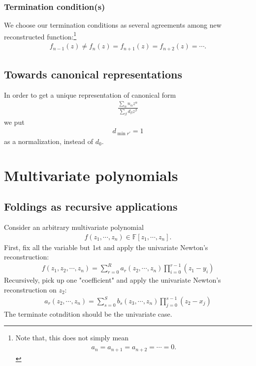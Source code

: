\documentclass[11pt]{book}
\begin{document}
\subsubsection{Termination condition(s)}
We choose our termination conditions as several agreements among new reconstructed function:\footnote{
Note that, this does not simply mean
\begin{eqnarray}
a_{n} = a_{n+1} = a_{n+2} = \cdots = 0.
\end{eqnarray}
}
\begin{eqnarray}
f_{n-1}(z) \neq f_n(z) = f_{n+1}(z) = f_{n+2}(z) = \cdots.
\end{eqnarray}

\subsection{Towards canonical representations}
In order to get a unique representation of canonical form
\begin{eqnarray}
\frac{\sum_\alpha n_\alpha z^\alpha}{\sum_\beta d_\beta z^\beta}
\end{eqnarray}
we put
\begin{eqnarray}
d_{\min r'} = 1
\end{eqnarray}
as a normalization, instead of $d_0$.

\section{Multivariate polynomials}

\subsection{Foldings as recursive applications}
Consider an arbitrary multivariate polynomial
\begin{eqnarray}
f(z_1,\cdots, z_n) \in \mathbb{F}[z_1,\cdots, z_n].
\end{eqnarray}
First, fix all the variable but 1st and apply the univariate Newton's reconstruction:
\begin{eqnarray}
f(z_1, z_2, \cdots, z_n) = \sum_{r=0}^R a_r (z_2,\cdots, z_n) \prod_{i=0}^{r-1}(z_1 - y_i)
\end{eqnarray}
Recursively, pick up one "coefficient" and apply the univariate Newton's reconstruction on $z_2$:
\begin{eqnarray}
a_r(z_2, \cdots, z_n) = \sum_{s=0}^{S} b_s (z_3,\cdots, z_n) \prod_{j=0}^{s-1}(z_2 - x_j)
\end{eqnarray}
The terminate cotndition should be the univariate case.
\end{document}

